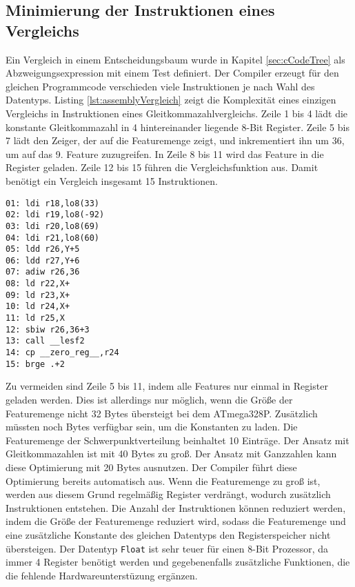 \subsection{Minimierung der Instruktionen eines Vergleichs}
Ein Vergleich in einem Entscheidungsbaum wurde in Kapitel \ref{sec:cCodeTree} als Abzweigungsexpression mit einem Test definiert. Der Compiler erzeugt für den gleichen Programmcode verschieden viele Instruktionen
je nach Wahl des Datentyps.
\newline
\newline
Listing \ref{lst:assemblyVergleich} zeigt die Komplexität eines einzigen Vergleichs in Instruktionen eines Gleitkommazahlvergleichs. Zeile 1 bis 4 lädt die konstante Gleitkommazahl in 4 hintereinander liegende
8-Bit Register. Zeile 5 bis 7 lädt den Zeiger, der auf die Featuremenge zeigt, und inkrementiert ihn um 36, um auf das 9. Feature zuzugreifen. In Zeile 8 bis 11 wird das Feature in die Register geladen. Zeile 12 bis 15 führen die
Vergleichsfunktion aus. Damit benötigt ein Vergleich insgesamt 15 Instruktionen.
\begin{lstlisting}[label=lst:assemblyVergleich,caption={Vergleich von Feature als Gleitkommazahl mit konstanter Gleitkommazahl.}]
01: ldi r18,lo8(33)
02: ldi r19,lo8(-92)
03: ldi r20,lo8(69)
04: ldi r21,lo8(60)
05: ldd r26,Y+5
06: ldd r27,Y+6
07: adiw r26,36
08: ld r22,X+
09: ld r23,X+
10: ld r24,X+
11: ld r25,X
12: sbiw r26,36+3
13: call __lesf2
14: cp __zero_reg__,r24
15: brge .+2
\end{lstlisting}
Zu vermeiden sind Zeile 5 bis 11, indem alle Features nur einmal in Register geladen werden. Dies ist allerdings nur möglich, wenn die Größe der Featuremenge nicht 32 Bytes übersteigt bei dem
ATmega328P. Zusätzlich müssten noch Bytes verfügbar sein, um die Konstanten zu laden. Die Featuremenge der Schwerpunktverteilung beinhaltet 10 Einträge. Der Ansatz mit Gleitkommazahlen ist mit 40 Bytes zu groß.
Der Ansatz mit Ganzzahlen kann diese Optimierung mit 20 Bytes ausnutzen. Der Compiler führt diese Optimierung bereits automatisch aus. Wenn die Featuremenge zu groß ist, werden aus diesem Grund regelmäßig
Register verdrängt, wodurch zusätzlich Instruktionen entstehen. Die Anzahl der Instruktionen können reduziert werden, indem die Größe der Featuremenge reduziert wird, sodass die Featuremenge und eine
zusätzliche Konstante des gleichen Datentyps den Registerspeicher nicht übersteigen.
\newline
\newline
Der Datentyp \texttt{Float} ist sehr teuer für einen 8-Bit Prozessor, da immer 4 Register benötigt werden und gegebenenfalls zusätzliche Funktionen, die die fehlende Hardwareunterstüzung ergänzen.
